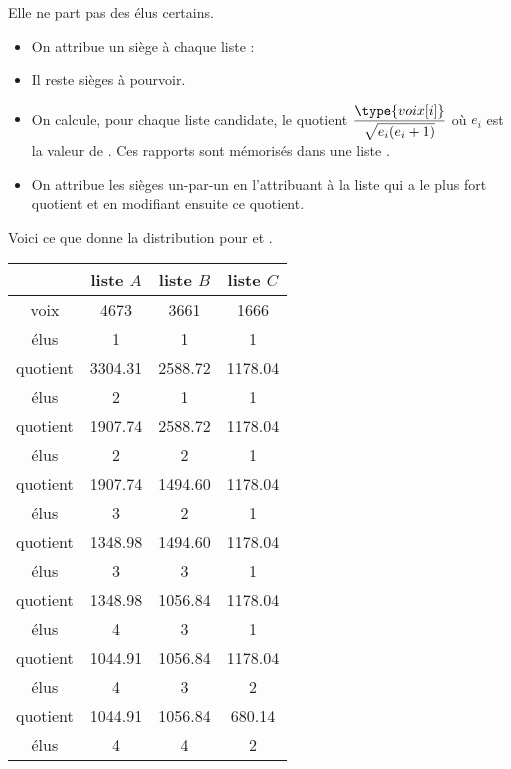 Elle ne part pas des élus certains.

\medskip

\begin{itemize}
\item On attribue un siège à chaque liste : 
\item Il reste  sièges à pourvoir.
\item On calcule, pour chaque liste candidate, le quotient $\displaystyle \frac{\type{voix[i]}}{\sqrt{e_i(e_i+1)}}$ 
où $e_i$ est la valeur de . Ces rapports sont mémorisés dans une liste .
\item On attribue les  sièges un-par-un en l'attribuant à la liste qui a le plus fort quotient et en modifiant ensuite ce quotient.
\end{itemize}
Voici ce que donne la distribution pour  et .

\begin{center} 
\begin{tabular}{c|ccc}
          & liste $A$ & liste $B$ & liste $C$ \\
\hline
voix      & 4673      & 3661      & 1666      \\
élus      &  1        & 1         &   1    \\
\hline
quotient  & 3304.31   & 2588.72   & 1178.04  \\
élus      &  2        & 1         &  1        \\
\hline
quotient  & 1907.74   & 2588.72   & 1178.04   \\
élus      &  2        & 2         &  1        \\
\hline
quotient  & 1907.74   & 1494.60   & 1178.04   \\
élus      &  3        & 2         &  1        \\
\hline
quotient  & 1348.98   & 1494.60   & 1178.04   \\
élus      &  3        & 3         &  1        \\
\hline
quotient  &  1348.98  & 1056.84   & 1178.04   \\
élus      &  4        & 3         &  1        \\
\hline
quotient  &  1044.91  & 1056.84   & 1178.04   \\
élus      &  4        & 3         &  2        \\
\hline
quotient  &  1044.91  & 1056.84   &  680.14   \\
élus      &  4        & 4         &  2        \\
\end{tabular}
\end{center}

